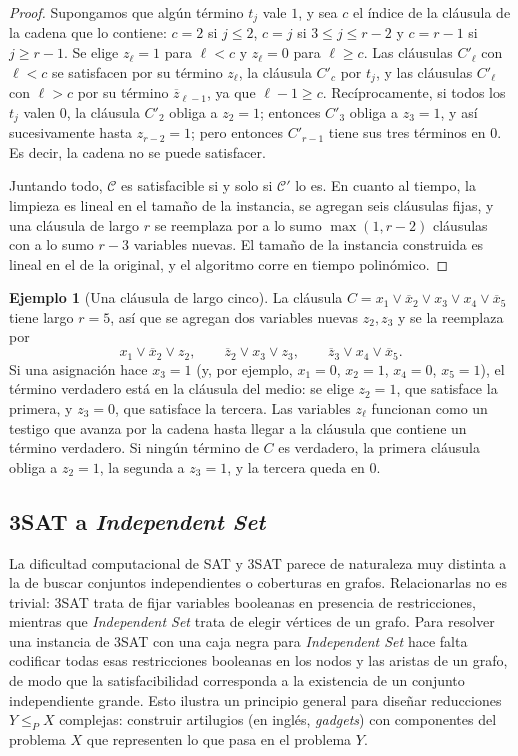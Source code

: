 \documentclass[12pt, spanish, oneside, openany]{book}
\newcommand{\redp}{\le_{P}}
\newcommand{\prob}[1]{\textit{#1}}
\newcommand{\IS}{\prob{Independent Set}\xspace}
\newcommand{\nega}[1]{\overline{#1}} %
\theoremstyle{uprightplain}
\theoremstyle{definition}
\newtheorem{ejemplo}[teorema]{Ejemplo}
\theoremstyle{remark}
\theoremstyle{definition}
\begin{document}
\begin{proof}
Supongamos que algún término $t_j$ vale $1$, y sea $c$ el índice de la cláusula de la cadena que lo contiene: $c=2$ si $j\le 2$, $c=j$ si $3\le j\le r-2$ y $c=r-1$ si $j\ge r-1$. Se elige $z_\ell=1$ para $\ell<c$ y $z_\ell=0$ para $\ell\ge c$. Las cláusulas $C'_\ell$ con $\ell<c$ se satisfacen por su término $z_\ell$, la cláusula $C'_c$ por $t_j$, y las cláusulas $C'_\ell$ con $\ell>c$ por su término $\nega{z}_{\ell-1}$, ya que $\ell-1\ge c$. Recíprocamente, si todos los $t_j$ valen $0$, la cláusula $C'_2$ obliga a $z_2=1$; entonces $C'_3$ obliga a $z_3=1$, y así sucesivamente hasta $z_{r-2}=1$; pero entonces $C'_{r-1}$ tiene sus tres términos en $0$. Es decir, la cadena no se puede satisfacer.

Juntando todo, $\mathcal{C}$ es satisfacible si y solo si $\mathcal{C}'$ lo es. En cuanto al tiempo, la limpieza es lineal en el tamaño de la instancia, se agregan seis cláusulas fijas, y una cláusula de largo $r$ se reemplaza por a lo sumo $\max(1,r-2)$ cláusulas con a lo sumo $r-3$ variables nuevas. El tamaño de la instancia construida es lineal en el de la original, y el algoritmo corre en tiempo polinómico.
\end{proof}

\begin{ejemplo}[Una cláusula de largo cinco]
\label{ej:np-cadena}
La cláusula $C=x_1\vee\nega{x}_2\vee x_3\vee x_4\vee\nega{x}_5$ tiene largo $r=5$, así que se agregan dos variables nuevas $z_2,z_3$ y se la reemplaza por
\[
x_1\vee\nega{x}_2\vee z_2,\qquad \nega{z}_2\vee x_3\vee z_3,\qquad \nega{z}_3\vee x_4\vee\nega{x}_5 .
\]
Si una asignación hace $x_3=1$ (y, por ejemplo, $x_1=0$, $x_2=1$, $x_4=0$, $x_5=1$), el término verdadero está en la cláusula del medio: se elige $z_2=1$, que satisface la primera, y $z_3=0$, que satisface la tercera. Las variables $z_\ell$ funcionan como un testigo que avanza por la cadena hasta llegar a la cláusula que contiene un término verdadero. Si ningún término de $C$ es verdadero, la primera cláusula obliga a $z_2=1$, la segunda a $z_3=1$, y la tercera queda en $0$.
\end{ejemplo}

\subsection{\texorpdfstring{3SAT a \prob{Independent Set}}{3SAT a Independent Set}}
\label{subsec:np-3sat-is}

La dificultad computacional de SAT y 3SAT parece de naturaleza muy distinta a la de buscar conjuntos independientes o coberturas en grafos. Relacionarlas no es trivial: 3SAT trata de fijar variables booleanas en presencia de restricciones, mientras que \IS trata de elegir vértices de un grafo. Para resolver una instancia de 3SAT con una caja negra para \IS hace falta codificar todas esas restricciones booleanas en los nodos y las aristas de un grafo, de modo que la satisfacibilidad corresponda a la existencia de un conjunto independiente grande. Esto ilustra un principio general para diseñar reducciones $Y\redp X$ complejas: construir artilugios (en inglés, \emph{gadgets}) con componentes del problema $X$ que representen lo que pasa en el problema $Y$.
\end{document}
